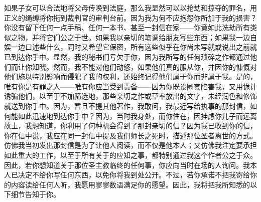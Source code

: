 如果子女可以合法地将父母传唤到法庭，那么我显然可以以抢劫和掠夺的罪名，用正义的绳缚将你拖到裁判官的审判台前。因为我为何不应抱怨你所加于我的损害？你没有留下任何一点手稿、任何一本书、甚至一封信在家——你竟如此洗劫所有类似之物，并将它们公之于世。如果我以亲切的笔调给朋友写些东西；如果我一边自娱一边口述些什么，同时又希望它保密，所有这些似乎在你尚未写就或说出之前就已到达你手中。显然，我的秘书们亏欠于你，因为我所写的任何琐碎之作都通过他们而让你知晓。然而，我不能对他们动怒，如果他们真的服从你，并因你的慷慨对他们施以特别影响而侵犯了我的权利，还始终记得他们属于你而非属于我。是的，唯有你是有罪之人——唯有你应当受到责备——因为你既设圈套陷害我，又用诡计诱骗他们，以至于不加筛选地，那些亲切之作或草率放出的文字，未经润色和修饰就送到你手中。因为，暂且不提其他著作，我敢问，我最近写给执事的那封信，如何能如此迅速地到达你手中？因为，当时我身处，而你住在，因挂虑你儿子而远离故土，我想知道，你利用了何种机会得到了那封亲切的信？因为我已收到你的信，你在信中说，我应在同一封信中提及我们师长之死时，描述那位圣者离世的方式。仿佛我当初发出那封信是为了让他人阅读，而不仅是他本人；又仿佛我注定要承担如此重大的工作，以至于所有关于的应知之事，都特别通过我这个作者公之于众。因此，若你想知道关于那位圣主教临终的任何事，你应向当时在场的人询问。我本人已决定不给你写任何东西，以免你将我到处公开。不过，若你承诺不把我寄给你的内容读给任何人听，我愿用寥寥数语满足你的愿望。因此，我将把我所知悉的以下细节告知于你。\par

